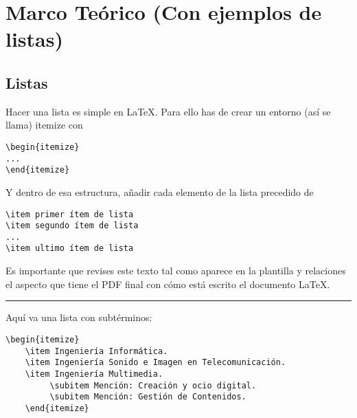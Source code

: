
\chapter{Marco Teórico (Con ejemplos de listas)}
\label{marcoteorico}

\section{Listas}
Hacer una lista es simple en \LaTeX. Para ello has de crear un entorno (así se llama) itemize con
\begin{lstlisting}[style=Latex-color]
\begin{itemize}
...
\end{itemize}
\end{lstlisting}
Y dentro de esa estructura, añadir cada elemento de la lista precedido de 
\begin{lstlisting}[style=Latex-color]
\item primer ítem de lista
\item segundo ítem de lista
...
\item ultimo ítem de lista
\end{lstlisting}

Es importante que revises este texto tal como aparece en la plantilla y relaciones el aspecto que tiene el PDF final con cómo está escrito el documento \LaTeX.
\vspace{1em}
\noindent\hrule
\vspace{1em}

Aquí va una lista con subtérminos:
\begin{lstlisting}[style=Latex-color]
	\begin{itemize}
    \item Ingeniería Informática.
    \item Ingeniería Sonido e Imagen en Telecomunicación.
    \item Ingeniería Multimedia.
         \subitem Mención: Creación y ocio digital.
         \subitem Mención: Gestión de Contenidos.
	\end{itemize}
\end{lstlisting}

